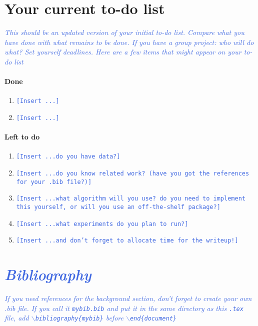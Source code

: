 \documentclass[11pt,letterpaper]{article}
\newcommand{\blue}[1]{\textcolor{RoyalBlue}{#1}}
\newcommand{\fillme}[1]{\blue{\texttt{[Insert #1]}}}
\newcommand{\instructions}[1]{\blue{\textit{#1}}}
\begin{document}
\section*{Your current to-do list}
\instructions{This should be an updated version of your initial to-do
  list. Compare what you have done with what remains to be done. If you have a group
  project: who will do what? Set yourself deadlines. Here are a few
  items that might appear on your to-do list}
\paragraph{Done}
\begin{enumerate}
\item \fillme{...}
\item \fillme{...}
\end{enumerate}
\paragraph{Left to do}
\begin{enumerate}
\item \fillme{...do you have data?}
\item \fillme{...do you know related work? (have you got the
    references  for your .bib file?)}
\item \fillme{...what algorithm will you use? do you need to implement
    this yourself, or will you use an off-the-shelf package?} 
\item \fillme{...what experiments do you plan to run?}
\item \fillme{...and don't forget to allocate time for the writeup!} 
\end{enumerate}

\section*{\instructions{Bibliography}}
\instructions{If you need references for the background section, don't forget to create your own .bib file. If you call it {\tt mybib.bib} and put it in the same directory as this {\tt .tex} file, add {\tt$\backslash$bibliography\{mybib\}} before {\tt$\backslash$end\{document\}}
}
  
\end{document}
